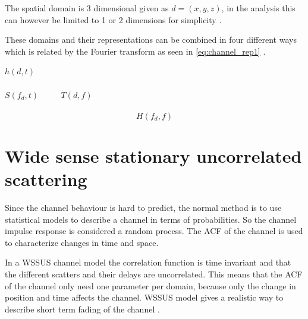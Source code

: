The spatial domain is 3 dimensional given as $d = (x,y,z)$, in the analysis this can however be limited to 1 or 2 dimensions for simplicity \citep{FTandCORR}.

These domains and their representations can be combined in four different ways which is related by the Fourier transform as seen in \autoref{eq:channel_rep1} \citep[ch. 6.3]{The_Mobile_Radio_Propagation_Channelbook}.

\begin{center}
$h(d,t)$\\
\\
$S(f_d,t)$ $\quad \quad$ $T( d,f)$\\
\\
\vspace{-1.9em}
\begin{equation}\label{eq:channel_rep1}
H(f_d,f)
\end{equation}
\end{center}
\begin{where}
\end{where}



\section{Wide sense stationary uncorrelated scattering}

Since the channel behaviour is hard to predict, the normal method is to use statistical models to describe a channel in terms of probabilities. So the channel impulse response is considered a random process. The \gls{ACF} of the channel is used to characterize changes in time and space.

In a \gls{WSSUS} channel model the correlation function is time invariant and that the different scatters and their delays are uncorrelated. This means that the ACF of the channel only need one parameter per domain, because only the change in position and time affects the channel. WSSUS model gives a realistic way to describe short term fading of the channel \citep[ch. 6.5-6.6]{The_Mobile_Radio_Propagation_Channelbook}.

